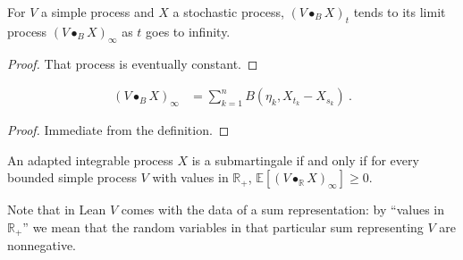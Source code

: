 \begin{lemma}\label{lem:tendsto_elemStochIntegral_limitProcess}
For $V$ a simple process and $X$ a stochastic process, $(V \bullet_B X)_t$ tends to its limit process $(V \bullet_B X)_\infty$ as $t$ goes to infinity.
\end{lemma}

\begin{proof}
That process is eventually constant.
\end{proof}


\begin{lemma}\label{lem:limitProcess_elemStochIntegral}
  \leanok
\begin{align*}
  (V \bullet_B X)_\infty
  &= \sum_{k=1}^{n} B (\eta_k, X_{t_k} - X_{s_k})
  \: .
\end{align*}
\end{lemma}

\begin{proof}
  \leanok
Immediate from the definition.
\end{proof}


\begin{lemma}\label{lem:submartingale_iff_integral_elemStochIntegral_nonneg}
An adapted integrable process $X$ is a submartingale if and only if for every bounded simple process $V$ with values in $\mathbb{R}_+$, $\mathbb{E}[(V \bullet_{\mathbb{R}} X)_\infty] \ge 0$.

Note that in Lean $V$ comes with the data of a sum representation: by ``values in $\mathbb{R}_+$'' we mean that the random variables in that particular sum representing $V$ are nonnegative.
\end{lemma}

